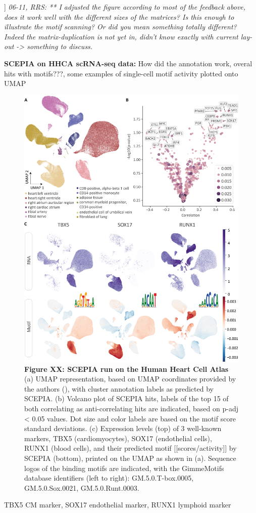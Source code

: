 ]
\textit{06-11, RRS: ** I adjusted the figure according to most of the feedback above, does it work well with the different sizes of the matrices? Is this enough to illustrate the motif scanning? Or did you mean something totally different? Indeed the matrix-duplication is not yet in, didn't know exactly with current lay-out -> something to discuss. }

\textbf{SCEPIA on HHCA scRNA-seq data: }
How did the annotation work, overal hits with motifs???, some examples of single-cell motif activity plotted onto UMAP
\begin{figure}
    \centering
    \includegraphics[width=0.75\linewidth]{SCEPIA_allCells_Fig1_v8_Calibri.png}
    \caption{\textbf{Figure XX: SCEPIA run on the Human Heart Cell Atlas} (a) UMAP representation, based on UMAP coordinates provided by the authors (\cite{Kanemaru2023}), with cluster annotation labels as predicted by SCEPIA. (b) Volcano plot of SCEPIA hits, labels of the top 15 of both correlating as anti-correlating hits are indicated, based on p-adj < 0.05 values. Dot size and color labels are based on the motif score standard deviations.  (c) Expression levels (top) of 3 well-known markers, TBX5 (cardiomyocytes), SOX17 (endothelial cells), RUNX1 (blood cells), and their predicted motif [[scores/activity]] by SCEPIA (bottom), printed on the UMAP as shown in (a). Sequence logos of the binding motifs are indicated, with the GimmeMotifs database identifiers (left to right): GM.5.0.T-box.0005, GM.5.0.Sox.0021, GM.5.0.Runt.0003. }
    \label{fig:scepia_hhca1}
\end{figure}
TBX5 CM marker, SOX17 endothelial marker, RUNX1 lymphoid marker 

